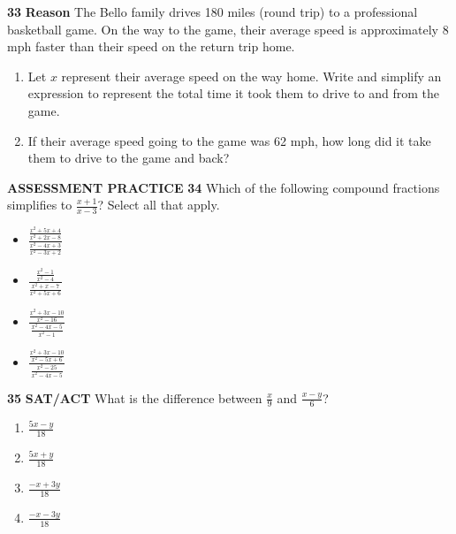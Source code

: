 \documentclass{article}
\newenvironment{practice}[2]{\textbf{#1}\quad}{\par}
\newcommand{\answer}[1]{}
\begin{document}
\begin{practice}{33}{unknown}
\textbf{Reason} The Bello family drives 180 miles (round trip) to a professional basketball game. On the way to the game, their average speed is approximately 8 mph faster than their speed on the return trip home.
\begin{enumerate}
    \item[\textbf{a.}] Let $x$ represent their average speed on the way home. Write and simplify an expression to represent the total time it took them to drive to and from the game.
    \item[\textbf{b.}] If their average speed going to the game was 62 mph, how long did it take them to drive to the game and back?
\end{enumerate}
\answer{}
\end{practice}

\textbf{ASSESSMENT PRACTICE}
\begin{practice}{34}{unknown}
Which of the following compound fractions simplifies to $\frac{x + 1}{x - 3}$? Select all that apply.
\begin{itemize}
    \item[$\square$] $\frac{\frac{x^2 + 5x + 4}{x^2 + 2x - 8}}{\frac{x^2 - 4x + 3}{x^2 - 3x + 2}}$
    \item[$\square$] $\frac{\frac{x^2 - 1}{x^2 - 4}}{\frac{x^2 + x - 7}{x^2 + 5x + 6}}$
    \item[$\square$] $\frac{\frac{x^2 + 3x - 10}{x^2 - 16}}{\frac{x^2 - 4x - 5}{x^2 - 1}}$
    \item[$\square$] $\frac{\frac{x^2 + 3x - 10}{x^2 - 5x + 6}}{\frac{x^2 - 25}{x^2 - 4x - 5}}$
\end{itemize}
\answer{}
\end{practice}

\begin{practice}{35}{unknown}
\textbf{SAT/ACT} What is the difference between $\frac{x}{9}$ and $\frac{x - y}{6}$?
\begin{enumerate}
    \item[\textbf{A}] $\frac{5x - y}{18}$
    \item[\textbf{B}] $\frac{5x + y}{18}$
    \item[\textbf{C}] $\frac{-x + 3y}{18}$
    \item[\textbf{D}] $\frac{-x - 3y}{18}$
\end{enumerate}
\answer{}
\end{practice}
\end{document}
